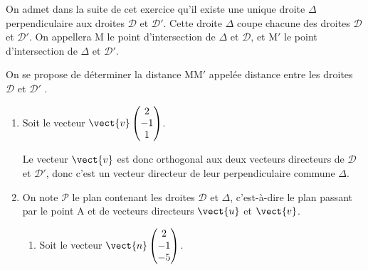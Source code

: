 On admet dans la suite de cet exercice qu'il existe une unique droite $\Delta$ perpendiculaire aux droites $\mathcal{D}$ et $\mathcal{D}'$. Cette droite $\Delta$ coupe chacune des droites $\mathcal{D}$ et $\mathcal{D}'$. On appellera M le point d'intersection de $\Delta$ et $\mathcal{D}$, et M$'$ le point d'intersection de $\Delta$ et $\mathcal{D}'$.

On se propose de déterminer la distance MM$'$ appelée \og distance entre les droites $\mathcal{D}$ et $\mathcal{D}'$ \fg.

\begin{enumerate}[resume]
\item Soit le vecteur $\vect{v}\begin{pmatrix}2\\- 1\\1\end{pmatrix}$.


Le vecteur $\vect{v}$ est donc orthogonal aux deux vecteurs directeurs de $\mathcal{D}$ et $\mathcal{D}'$, donc c'est un vecteur directeur de leur perpendiculaire commune $\Delta$.

\item On note $\mathcal{P}$ le plan contenant les droites $\mathcal{D}$ et $\Delta$, c'est-à-dire le plan passant par le point A et de vecteurs directeurs $\vect{u}$ et $\vect{v}$.
	\begin{enumerate}
		\item Soit le vecteur $\vect{n}\begin{pmatrix}2\\-1\\-5 \end{pmatrix}$.
		


\end{enumerate}
\end{enumerate}
